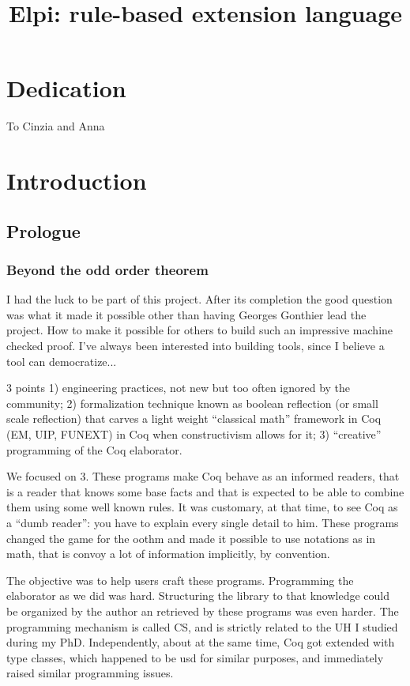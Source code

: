 \documentclass[a4paper, 11pt]{book}
\title{Elpi: rule-based extension language}
\newenvironment{dedication}
  {%
   \thispagestyle{empty}%
   \vspace*{\stretch{1}}%
   \itshape             %
   \raggedleft          %
  }
  {\par %
   \vspace{\stretch{3}} %
   \clearpage           %
  }
\begin{document}
  
\chapter*{Dedication}
\begin{dedication}
To Cinzia and Anna
\end{dedication}

\setcounter{tocdepth}{5}
\tableofcontents

 \chapter{Introduction}


\section{Prologue}

\subsection{Beyond the odd order theorem}

I had the luck to be part of this project.
After its completion the good question was what it made it possible
other than having Georges Gonthier lead the project. How to make
it possible for others to build such an impressive machine checked
proof. I've always been interested into building tools, since I believe
a tool can democratize...

3 points 1) engineering practices, not new but too often
ignored by the community; 2) formalization technique known as boolean
reflection (or small scale reflection) that carves a light weight
``classical math'' framework in Coq (EM, UIP, FUNEXT) in Coq when
constructivism allows for it; 3) ``creative'' programming of the
Coq elaborator.

We focused on 3. These programs make Coq behave as an informed readers,
that is a reader that knows some base facts and that is expected to
be able to combine them using some well known rules. It was customary,
at that time, to see Coq as a ``dumb reader'': you have to explain
every single detail to him. These programs changed the game  for the
oothm and made it possible to use notations as in math, that is convoy
a lot of information implicitly, by convention.

The objective was to help users craft these programs. Programming
the elaborator as we did was hard. Structuring the library to that
knowledge could be organized by the author an retrieved by these
programs was even harder. The programming mechanism is called CS,
and is strictly related to the UH I studied during my PhD.
Independently, about at the same time,
Coq got extended with type classes, which happened to be usd for similar
purposes, and immediately raised similar programming issues.
\end{document}
